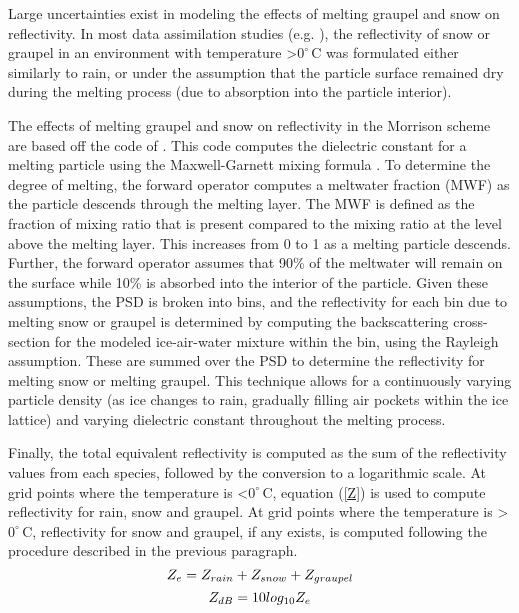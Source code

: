 Large uncertainties exist in modeling the effects of melting graupel and snow on reflectivity. In most data assimilation studies (e.g. \citealt{dowelletal11}), the reflectivity of snow or graupel in an environment with temperature \textgreater \(0^{\circ}\,\mathrm{C}\) was formulated either similarly to rain, or under the assumption that the particle surface remained dry during the melting process (due to absorption into the particle interior).

The effects of melting graupel and snow on reflectivity in the Morrison scheme are based off the code of \citet{blahak07}. This code computes the dielectric constant for a melting particle using the Maxwell-Garnett mixing formula \citep{maxwellgarnett04}. To determine the degree of melting, the forward operator computes a meltwater fraction (MWF) as the particle descends through the melting layer. The MWF is defined as the fraction of mixing ratio that is present compared to the mixing ratio at the level above the melting layer. This increases from 0 to 1 as a melting particle descends. Further, the forward operator assumes that 90\% of the meltwater will remain on the surface while 10\% is absorbed into the interior of the particle. Given these assumptions, the PSD is broken into bins, and the reflectivity for each bin due to melting snow or graupel is determined by computing the backscattering cross-section for the modeled ice-air-water mixture within the bin, using the Rayleigh assumption. These are summed over the PSD to determine the reflectivity for melting snow or melting graupel. This technique allows for a continuously varying particle density (as ice changes to rain, gradually filling air pockets within the ice lattice) and varying dielectric constant throughout the melting process.

Finally, the total equivalent reflectivity is computed as the sum of the reflectivity values from each species, followed by the conversion to a logarithmic scale. At grid points where the temperature is \textless \(0^{\circ}\,\mathrm{C}\), equation (\ref{Z}) is used to compute reflectivity for rain, snow and graupel. At grid points where the temperature is \textgreater \(0^{\circ}\,\mathrm{C}\), reflectivity for snow and graupel, if any exists, is computed following the procedure described in the previous paragraph.
\begin{equation}
\centering
Z_e = Z_{rain} + Z_{snow} + Z_{graupel}
\end{equation}
\begin{equation}
\centering
Z_{dB} = 10log_{10}Z_e
\end{equation}


